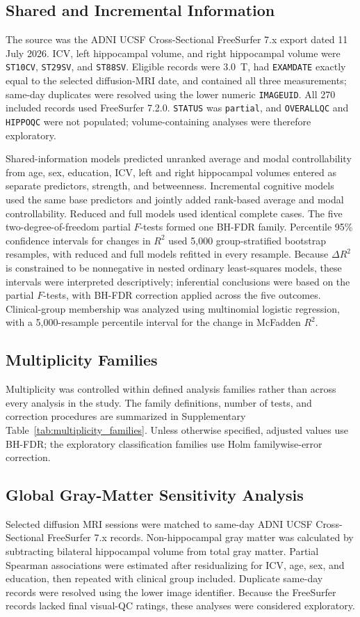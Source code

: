\documentclass{article}
\begin{document}
\subsection{Shared and Incremental Information}
The source was the ADNI UCSF Cross-Sectional FreeSurfer 7.x export dated 11 July 2026. ICV, left hippocampal volume, and right hippocampal volume were \texttt{ST10CV}, \texttt{ST29SV}, and \texttt{ST88SV}. Eligible records were 3.0~T, had \texttt{EXAMDATE} exactly equal to the selected diffusion-MRI date, and contained all three measurements; same-day duplicates were resolved using the lower numeric \texttt{IMAGEUID}. All 270 included records used FreeSurfer 7.2.0. \texttt{STATUS} was \texttt{partial}, and \texttt{OVERALLQC} and \texttt{HIPPOQC} were not populated; volume-containing analyses were therefore exploratory.

Shared-information models predicted unranked average and modal controllability from age, sex, education, ICV, left and right hippocampal volumes entered as separate predictors, strength, and betweenness. Incremental cognitive models used the same base predictors and jointly added rank-based average and modal controllability. Reduced and full models used identical complete cases. The five two-degree-of-freedom partial \(F\)-tests formed one BH-FDR family. Percentile 95\% confidence intervals for changes in \(R^2\) used 5,000 group-stratified bootstrap resamples, with reduced and full models refitted in every resample. Because \(\Delta R^2\) is constrained to be nonnegative in nested ordinary least-squares models, these intervals were interpreted descriptively; inferential conclusions were based on the partial \(F\)-tests, with BH-FDR correction applied across the five outcomes. Clinical-group membership was analyzed using multinomial logistic regression, with a 5,000-resample percentile interval for the change in McFadden \(R^2\).

\subsection{Multiplicity Families}
Multiplicity was controlled within defined analysis families rather than across every analysis in the study. The family definitions, number of tests, and correction procedures are summarized in Supplementary Table~\ref{tab:multiplicity_families}. Unless otherwise specified, adjusted values use BH-FDR; the exploratory classification families use Holm familywise-error correction.

\subsection{Global Gray-Matter Sensitivity Analysis}
Selected diffusion MRI sessions were matched to same-day ADNI UCSF Cross-Sectional FreeSurfer 7.x records. Non-hippocampal gray matter was calculated by subtracting bilateral hippocampal volume from total gray matter. Partial Spearman associations were estimated after residualizing for ICV, age, sex, and education, then repeated with clinical group included. Duplicate same-day records were resolved using the lower image identifier. Because the FreeSurfer records lacked final visual-QC ratings, these analyses were considered exploratory.
\end{document}

